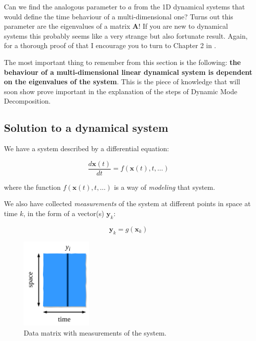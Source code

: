 \documentclass[10pt,twocolumn]{article}
\begin{document}
Can we find the analogous parameter to $a$ from the 1D dynamical systems that would define the time behaviour of a multi-dimensional one? Turns out this parameter are the eigenvalues of a matrix $\mathbf{A}$! If you are new to dynamical systems this probably seems like a very strange but also fortunate result. Again, for a thorough proof of that I encourage you to turn to Chapter 2 in \cite{Prof_Edward_Scheinerman}.

The most important thing to remember from this section is the following: \textbf{the behaviour of a multi-dimensional linear dynamical system is dependent on the eigenvalues of the system}. This is the piece of knowledge that will soon show prove important in the explanation of the steps of Dynamic Mode Decomposition.

\subsection{Solution to a dynamical system}

We have a system described by a differential equation:

\begin{equation} \label{eq:system_DE}
\frac{d \mathbf{x}(t)}{dt} = f(\mathbf{x}(t), t, \dots)
\end{equation}

where the function $f(\mathbf{x}(t), t, \dots)$ is a way of \textit{modeling} that system.

We also have collected \textit{measurements} of the system at different points in space at time $k$, in the form of a vector(s) $\mathbf{\mathbf{y}}_k$:

\begin{equation}
\mathbf{\mathbf{y}}_k = g(\mathbf{x}_k)
\end{equation}

\begin{figure}
\centering\includegraphics[width=3.5cm]{data-matrix.png}
\caption{Data matrix with measurements of the system.}
\label{fig:data-matrix}
\end{figure}
\end{document}
